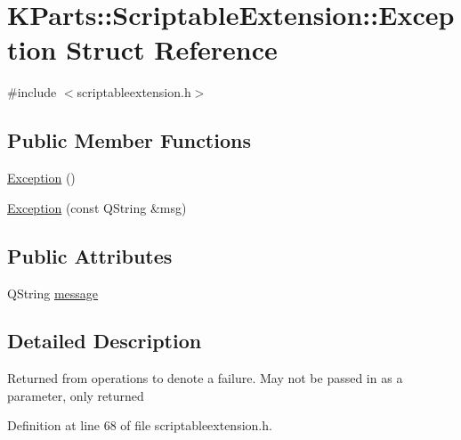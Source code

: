 \hypertarget{structKParts_1_1ScriptableExtension_1_1Exception}{\section{\-K\-Parts\-:\-:\-Scriptable\-Extension\-:\-:\-Exception \-Struct \-Reference}
\label{structKParts_1_1ScriptableExtension_1_1Exception}
}


{\ttfamily \#include $<$scriptableextension.\-h$>$}

\subsection*{\-Public \-Member \-Functions}
\begin{DoxyCompactItemize}
\item 
\hyperlink{structKParts_1_1ScriptableExtension_1_1Exception_a0e8550fd8417396956f5b7a4fc78768b}{\-Exception} ()
\item 
\hyperlink{structKParts_1_1ScriptableExtension_1_1Exception_ac4c4baf6868b49f539c9f7492ce3515d}{\-Exception} (const \-Q\-String \&msg)
\end{DoxyCompactItemize}
\subsection*{\-Public \-Attributes}
\begin{DoxyCompactItemize}
\item 
\-Q\-String \hyperlink{structKParts_1_1ScriptableExtension_1_1Exception_aa077475854a1ee79ac8905a2e07be407}{message}
\end{DoxyCompactItemize}


\subsection{\-Detailed \-Description}
\-Returned from operations to denote a failure. \-May not be passed in as a parameter, only returned 

\-Definition at line 68 of file scriptableextension.\-h.



